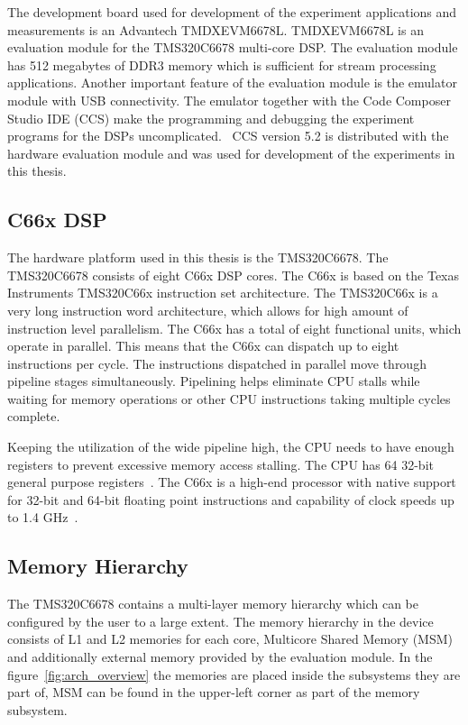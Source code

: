 The development board used for development of the experiment applications and measurements is an Advantech TMDXEVM6678L. TMDXEVM6678L is an evaluation module for the TMS320C6678 multi-core DSP. The evaluation module has 512 megabytes of DDR3 memory which is sufficient for stream processing applications. Another important feature of the evaluation module is the emulator module with USB connectivity. The emulator together with the Code Composer Studio IDE (CCS) make the programming and debugging the experiment programs for the DSPs uncomplicated.~\cite{evmref} CCS version 5.2 is distributed with the hardware evaluation module and was used for development of the experiments in this thesis.

\subsection{C66x DSP}
\label{subsec:c66x}
The hardware platform used in this thesis is the TMS320C6678. The TMS320C6678 consists of eight C66x DSP cores. The C66x is based on the Texas Instruments TMS320C66x instruction set architecture. The TMS320C66x is a very long instruction word architecture, which allows for high amount of instruction level parallelism. The C66x has a total of eight functional units, which operate in parallel. This means that the C66x can dispatch up to eight instructions per cycle. The instructions dispatched in parallel move through pipeline stages simultaneously. Pipelining helps eliminate CPU stalls while waiting for memory operations or other CPU instructions taking multiple cycles complete.~\cite{sprugh7}

Keeping the utilization of the wide pipeline high, the CPU needs to have enough registers to prevent excessive memory access stalling. The CPU has 64 32-bit general purpose registers~\cite{sprugh7}. The C66x is a high-end processor with native support for 32-bit and 64-bit floating point instructions and capability of clock speeds up to 1.4 GHz~\cite{sprugh7}.

\subsection{Memory Hierarchy}
\label{subsec:c66memory}
The TMS320C6678 contains a multi-layer memory hierarchy which can be configured by the user to a large extent. The memory hierarchy in the device consists of L1 and L2 memories for each core, Multicore Shared Memory (MSM) and additionally external memory provided by the evaluation module. In the figure~\ref{fig:arch_overview} the memories are placed inside the subsystems they are part of, MSM can be found in the upper-left corner as part of the memory subsystem.

